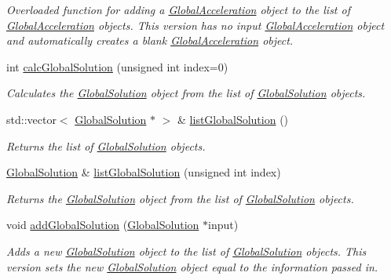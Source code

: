 \begin{DoxyCompactItemize}
\begin{DoxyCompactList}\small\item\em Overloaded function for adding a \hyperlink{classosea_1_1ofreq_1_1_global_acceleration}{Global\-Acceleration} object to the list of \hyperlink{classosea_1_1ofreq_1_1_global_acceleration}{Global\-Acceleration} objects. This version has no input \hyperlink{classosea_1_1ofreq_1_1_global_acceleration}{Global\-Acceleration} object and automatically creates a blank \hyperlink{classosea_1_1ofreq_1_1_global_acceleration}{Global\-Acceleration} object. \end{DoxyCompactList}\item 
int \hyperlink{classosea_1_1ofreq_1_1_outputs_body_a0d970726f3d24a2014f3f872852e9c6f}{calc\-Global\-Solution} (unsigned int index=0)
\begin{DoxyCompactList}\small\item\em Calculates the \hyperlink{classosea_1_1ofreq_1_1_global_solution}{Global\-Solution} object from the list of \hyperlink{classosea_1_1ofreq_1_1_global_solution}{Global\-Solution} objects. \end{DoxyCompactList}\item 
std\-::vector$<$ \hyperlink{classosea_1_1ofreq_1_1_global_solution}{Global\-Solution} $\ast$ $>$ \& \hyperlink{classosea_1_1ofreq_1_1_outputs_body_aef867ab4e6884f0dad8fcc8d57a18cdb}{list\-Global\-Solution} ()
\begin{DoxyCompactList}\small\item\em Returns the list of \hyperlink{classosea_1_1ofreq_1_1_global_solution}{Global\-Solution} objects. \end{DoxyCompactList}\item 
\hyperlink{classosea_1_1ofreq_1_1_global_solution}{Global\-Solution} \& \hyperlink{classosea_1_1ofreq_1_1_outputs_body_a8f79408b1a84cc54f52743514b88b659}{list\-Global\-Solution} (unsigned int index)
\begin{DoxyCompactList}\small\item\em Returns the \hyperlink{classosea_1_1ofreq_1_1_global_solution}{Global\-Solution} object from the list of \hyperlink{classosea_1_1ofreq_1_1_global_solution}{Global\-Solution} objects. \end{DoxyCompactList}\item 
void \hyperlink{classosea_1_1ofreq_1_1_outputs_body_ac5657a2f9a4ac48a56db7b081864ea8d}{add\-Global\-Solution} (\hyperlink{classosea_1_1ofreq_1_1_global_solution}{Global\-Solution} $\ast$input)
\begin{DoxyCompactList}\small\item\em Adds a new \hyperlink{classosea_1_1ofreq_1_1_global_solution}{Global\-Solution} object to the list of \hyperlink{classosea_1_1ofreq_1_1_global_solution}{Global\-Solution} objects. This version sets the new \hyperlink{classosea_1_1ofreq_1_1_global_solution}{Global\-Solution} object equal to the information passed in. \end{DoxyCompactList}\item 

\end{DoxyCompactItemize}
